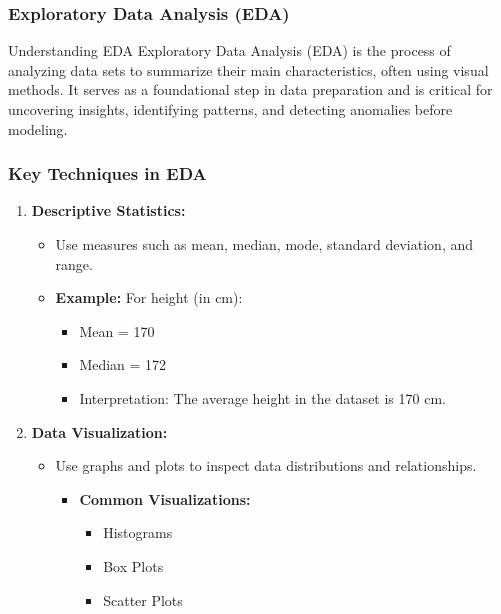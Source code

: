 \documentclass{beamer}
\begin{document}
\begin{frame}[fragile]
    \frametitle{Exploratory Data Analysis (EDA)}
    \begin{block}{Understanding EDA}
        Exploratory Data Analysis (EDA) is the process of analyzing data sets to summarize their main characteristics, often using visual methods. It serves as a foundational step in data preparation and is critical for uncovering insights, identifying patterns, and detecting anomalies before modeling.
    \end{block}
\end{frame}

\begin{frame}[fragile]
    \frametitle{Key Techniques in EDA}
    \begin{enumerate}
        \item \textbf{Descriptive Statistics:}
            \begin{itemize}
                \item Use measures such as mean, median, mode, standard deviation, and range.
                \item \textbf{Example:} For height (in cm):
                    \begin{itemize}
                        \item Mean = 170
                        \item Median = 172
                        \item Interpretation: The average height in the dataset is 170 cm.
                    \end{itemize}
            \end{itemize}
        
        \item \textbf{Data Visualization:}
            \begin{itemize}
                \item Use graphs and plots to inspect data distributions and relationships.
                \begin{itemize}
                    \item \textbf{Common Visualizations:}
                        \begin{itemize}
                            \item Histograms
                            \item Box Plots
                            \item Scatter Plots
                        \end{itemize}
                \end{itemize}
            \end{itemize}
    \end{enumerate}
\end{frame}
\end{document}

